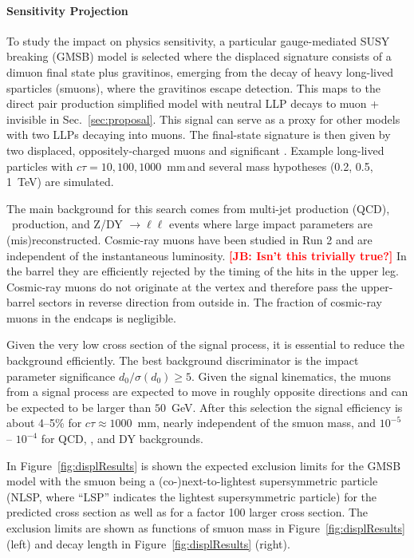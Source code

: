 \paragraph{Sensitivity Projection}

To study the impact on physics sensitivity, a particular gauge-mediated SUSY breaking (GMSB) model is selected where the displaced signature consists of a dimuon final state plus gravitinos, emerging from the decay of heavy long-lived sparticles (smuons), where the gravitinos escape detection. This maps to the direct pair production simplified model with neutral LLP decays to muon + invisible in Sec.~\ref{sec:proposal}. This signal can serve as a proxy for other models with two LLPs decaying into muons. The final-state signature is then given by two displaced, oppositely-charged muons and significant \met. Example long-lived particles with $c\tau=10, 100, 1000$~mm\,and several mass hypotheses (0.2, 0.5, 1~TeV) are simulated.

The main background for this search comes from multi-jet production (QCD), \ttbar~production, and Z/DY $\to\ell\ell$ events where large impact parameters are (mis)reconstructed. Cosmic-ray muons have been studied in Run 2 and are independent of the instantaneous luminosity. {\bf \textcolor{red}{[JB: Isn't this trivially true?]}} In the barrel they are efficiently rejected by the timing of the hits in the upper leg. Cosmic-ray muons do not originate at the vertex and therefore pass the upper-barrel sectors in reverse direction from outside in. The fraction of cosmic-ray muons in the endcaps is negligible.

Given the very low cross section of the signal process, it is essential to reduce the background efficiently. The best background discriminator is the impact parameter significance $d_0 / \sigma (d_0) \geq 5$. Given the signal kinematics, the muons from a signal process are expected to move in roughly opposite directions and \met can be expected to be larger than $50$~GeV. After this selection the signal efficiency is about 4--5\% for $c\tau \approx 1000$~mm, nearly independent of the smuon mass, and $10^{-5}$ -- $10^{-4}$ for QCD, \ttbar, and DY backgrounds.

In Figure~\ref{fig:displResults} is shown the expected exclusion limits for the GMSB model with the smuon being a (co-)next-to-lightest supersymmetric particle (NLSP, where ``LSP'' indicates the lightest supersymmetric particle) for the predicted cross section as well as for a factor 100 larger cross section. The exclusion limits are shown as functions of smuon mass in Figure~\ref{fig:displResults} (left) and decay length in Figure~\ref{fig:displResults} (right).

